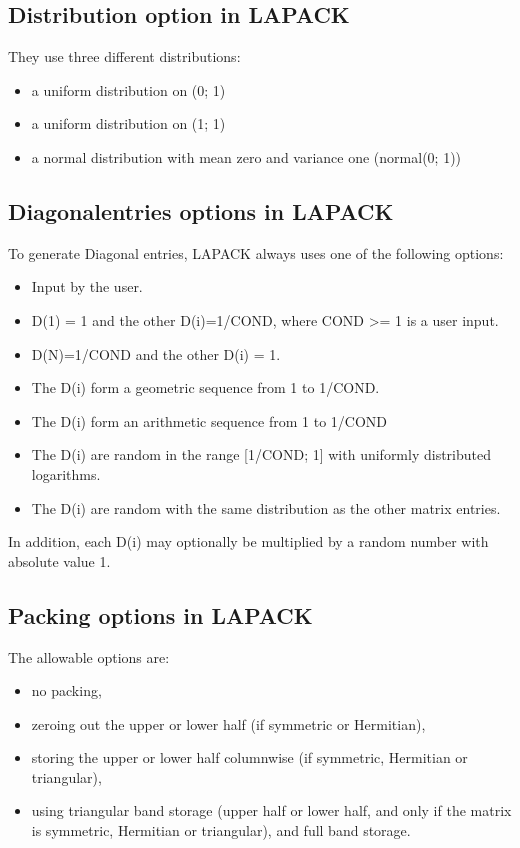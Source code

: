 \documentclass[a4paper]{article}
\begin{document}
\subsection{Distribution option in LAPACK}
They use three different distributions:
\begin{itemize}
\item a uniform distribution on (0; 1)
\item a uniform distribution on (1; 1)
\item a normal distribution with mean zero and variance one (normal(0; 1))
\end{itemize}

\subsection{Diagonalentries options in LAPACK}
To generate Diagonal entries, LAPACK always uses one of the following options:
\begin{itemize}
	\item Input by the user.
	\item D(1) = 1 and the other D(i)=1/COND, where COND >= 1 is a user input.
	\item D(N)=1/COND and the other D(i) = 1. 
	\item The D(i) form a geometric sequence from 1 to 1/COND. 
	\item The D(i) form an arithmetic sequence from 1 to 1/COND
	\item The D(i) are random in the range [1/COND; 1] with uniformly distributed logarithms. 
	\item The D(i) are random with the same distribution as the other matrix entries.
\end{itemize}
In addition, each D(i) may optionally be multiplied by a random number with absolute value 1.

\subsection{Packing options in LAPACK}
The allowable options are: 
\begin{itemize}
\item no packing, 
\item zeroing out the upper or lower half (if symmetric or Hermitian), 
\item storing the upper or lower half columnwise (if symmetric, Hermitian or triangular), 
\item using triangular band storage (upper half or lower half, and only if the matrix is symmetric, Hermitian or triangular), and full band storage.
\end{itemize}
\end{document}
